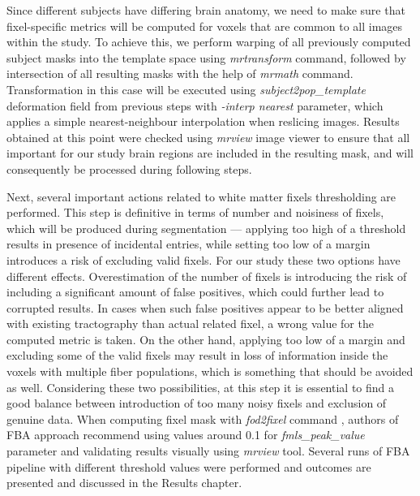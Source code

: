 \documentclass[thesis.tex]{subfiles}
\begin{document}
Since different subjects have differing brain anatomy, we need to make sure that fixel-specific metrics will be computed for voxels that are common to all images within the study. To achieve this, we perform warping of all previously computed subject masks into the template space using \textit{mrtransform} \cite{mrtrixDocu} command, followed by intersection of all resulting masks with the help of \textit{mrmath} \cite{mrtrixDocu} command. Transformation in this case will be executed using \textit{subject2pop\_template} deformation field from previous steps with \textit{-interp nearest} parameter, which applies a simple nearest-neighbour interpolation when reslicing images. Results obtained at this point were checked using \textit{mrview} \cite{mrtrixGeneral2019} image viewer to ensure that all important for our study brain regions are included in the resulting mask, and will consequently be processed during following steps.

Next, several important actions related to white matter fixels thresholding are performed. This step is definitive in terms of number and noisiness of fixels, which will be produced during segmentation --- applying too high of a threshold results in presence of incidental entries, while setting too low of a margin introduces a risk of excluding valid fixels. For our study these two options have different effects. Overestimation of the number of fixels is introducing the risk of including a significant amount of false positives, which could further lead to corrupted results. In cases when such false positives appear to be better aligned with existing tractography than actual related fixel, a wrong value for the computed metric is taken.
On the other hand, applying too low of a margin and excluding some of the valid fixels may result in loss of information inside the voxels with multiple fiber populations, which is something that should be avoided as well. Considering these two possibilities, at this step it is essential to find a good balance between introduction of too many noisy fixels and exclusion of genuine data. When computing fixel mask with \textit{fod2fixel} command \cite{fod2fixel}, authors of FBA approach recommend using values around 0.1 for \textit{fmls\_peak\_value} parameter and validating results visually using \textit{mrview} tool.  Several runs of FBA pipeline with different threshold values were performed and outcomes are presented and discussed in the Results chapter.
\end{document}
